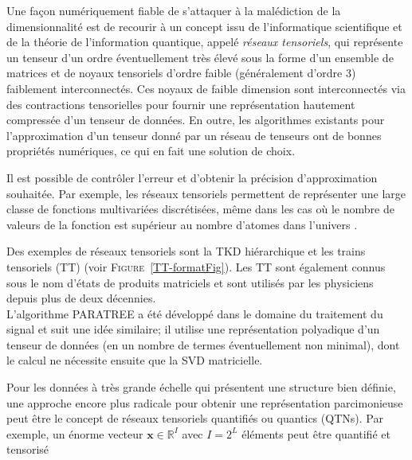 \documentclass[11pt,a4paper,oneside]{book}
\def\R{\mathbb R}
\def\x{\mathbf x}
\newcommand{\figref}[1]{\textsc{Figure}~\ref{#1}}
\begin{document}
Une façon numériquement fiable de s'attaquer à la malédiction de la dimensionnalité est de recourir à un concept issu de l'informatique scientifique et de la théorie de l'information quantique, appelé \textit{réseaux tensoriels}, qui représente un tenseur d'un ordre éventuellement très élevé sous la forme d'un ensemble de matrices et de noyaux tensoriels d'ordre faible (généralement d'ordre 3) faiblement interconnectés. Ces noyaux de faible dimension sont interconnectés via des contractions tensorielles pour fournir une représentation hautement compressée d'un tenseur de données. En outre, les algorithmes existants pour l'approximation d'un tenseur donné par un réseau de tenseurs ont de bonnes propriétés numériques, ce qui en fait une solution de choix.
\par Il est possible de contrôler l'erreur et d'obtenir la précision d'approximation souhaitée. Par exemple, les réseaux tensoriels permettent de représenter une large classe de fonctions multivariées discrétisées, même dans les cas où le nombre de valeurs de la fonction est supérieur au nombre d'atomes dans l'univers \cite[p.156]{cichocki2015tensor}.
\par Des exemples de réseaux tensoriels sont la TKD hiérarchique et les trains tensoriels (TT) (voir \figref{TT-formatFig}). Les TT sont également connus sous le nom d'états de produits matriciels et sont utilisés par les physiciens depuis plus de deux décennies.\\
 L'algorithme PARATREE a été développé dans le domaine du traitement du signal et suit une idée similaire; il utilise une représentation polyadique d'un tenseur de données (en un nombre de termes éventuellement non minimal), dont le calcul ne nécessite ensuite que la SVD matricielle.
\par Pour les données à très grande échelle qui présentent une structure bien définie, une approche encore plus radicale pour obtenir une représentation parcimonieuse peut être le concept de réseaux tensoriels quantifiés ou quantics (QTNs). Par exemple, un énorme vecteur $ \x\in\R^{I} $ avec $ I = 2^{L} $ éléments peut être quantifié et tensorisé
\end{document}
